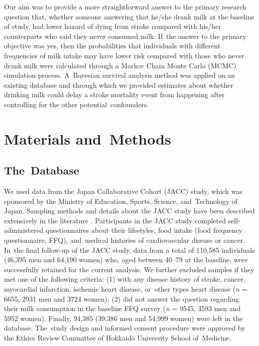 \documentclass[nutrients,article,accept,moreauthors,pdftex]{Definitions/mdpi}
\begin{document}
Our aim was to provide a more straightforward answer to the primary
research question that, whether someone answering that he/she drank milk at the
baseline of study, had lower hazard of dying from stroke compared with
his/her counterparts who said they never consumed milk. If~the answer to
the primary objective was yes, then the probabilities that individuals
with different frequencies of milk intake may have lower risk compared
with those who never drank milk were calculated through a Markov Chain
Monte Carlo (MCMC) simulation process. A~Bayesian survival analysis
method was applied on an existing database and through which we
provided estimates about whether drinking milk could delay a stroke
mortality event from happening after controlling for the other \mbox{potential
confounders.}

\hypertarget{materials-and-methods}{%
\section{Materials and~Methods}\label{materials-and-methods}}
\vspace{-5pt}

\hypertarget{the-database}{%
\subsection{The~Database}\label{the-database}}

We used data from the Japan Collaborative Cohort (JACC) study, which was
sponsored by the Ministry of Education, Sports, Science, and~Technology
of Japan. Sampling methods and details about the JACC study have been
described extensively in the literature
\citep{Ohno2001, Tamakoshi2005, Tamakoshi2013}. Participants in the JACC
study completed self-administered questionnaires about their lifestyles,
food intake (food frequency questionnaire, FFQ), and~medical histories
of cardiovascular disease or cancer. In~the final follow-up of the JACC
study, data from a total of 110,585 individuals (46,395 men and 64,190
women) who, aged between 40--79 at the baseline, were successfully retained
for the current analysis. We further excluded samples if they met one
of the following criteria: (1) with any disease history of stroke,
cancer, myocardial infarction, ischemic heart disease, or~other types
heart disease (\emph{n} = 6655, 2931 men and 3724 women); (2) did not answer the
question regarding their milk consumption in the baseline FFQ survey (\emph{n}
= 9545, 3593 men and 5952 women). Finally, 94,385 (39,386 men and 54,999
women) were left in the database. The~study design and informed consent
procedure were approved by the Ethics Review Committee of Hokkaido
University School of~Medicine.
\end{document}
